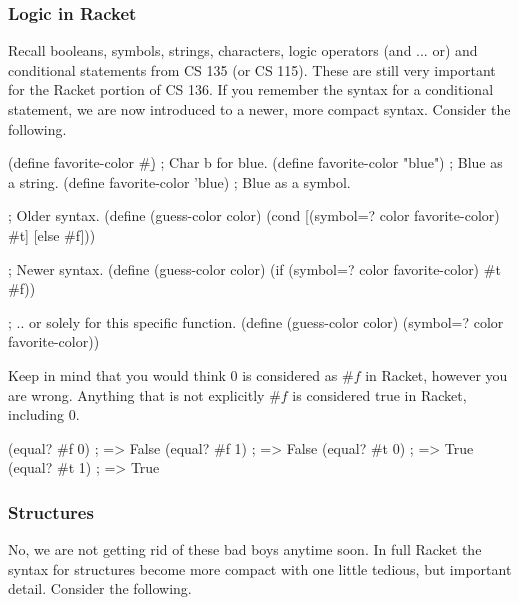 \subsubsection*{Logic in Racket}

Recall booleans, symbols, strings, characters, logic operators (and ... or) and conditional statements from CS 135 (or CS 115). These are still very important for the Racket portion of CS 136. If you remember the syntax for a conditional statement, we are now introduced to a newer, more compact syntax. Consider the following.\\


\begin{code}[Lisp]
(define favorite-color #\b) ; Char b for blue.
(define favorite-color "blue") ; Blue as a string.
(define favorite-color 'blue) ; Blue as a symbol.

; Older syntax.
(define (guess-color color)
	(cond
		[(symbol=? color favorite-color) #t]
		[else #f]))

; Newer syntax.
(define (guess-color color)
	(if (symbol=? color favorite-color) #t #f))

; .. or solely for this specific function.
(define (guess-color color)
	(symbol=? color favorite-color))
\end{code}

Keep in mind that you would think 0 is considered as $\#f$ in Racket, however you are wrong. Anything that is not explicitly $\#f$ is considered true in Racket, including 0.\\

\begin{code}[Lisp]
(equal? #f 0) ; => False
(equal? #f 1) ; => False
(equal? #t 0) ; => True
(equal? #t 1) ; => True
\end{code}

\subsubsection*{Structures}

No, we are not getting rid of these bad boys anytime soon. In full Racket the syntax for structures become more compact with one little tedious, but important detail. Consider the following.\\


